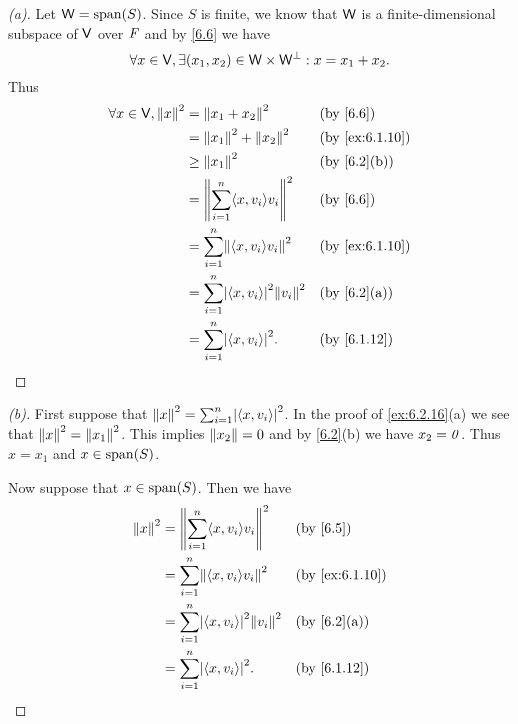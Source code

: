 \begin{proof}[(a)]
	Let \(\W = \spn{S}\).
	Since \(S\) is finite, we know that \(\mathsf{W}\) is a finite-dimensional subspace of \(\mathsf{V}\) over \(\mathit{F}\) and by \cref{6.6} we have
	\[
		\forall x \in \mathsf{V}, \exists (x_1, x_2) \in \mathsf{W} \times \mathsf{W}^{\perp} : x = x_1 + x_2.
	\]
	Thus
	\begin{align*}
		\forall x \in \V, \norm{x}^2 & = \norm{x_1 + x_2}^2                               &  & \by{6.6}       \\
		                             & = \norm{x_1}^2 + \norm{x_2}^2                      &  & \by{ex:6.1.10} \\
		                             & \geq \norm{x_1}^2                                  &  & \by{6.2}[b]    \\
		                             & = \norm{\sum_{i = 1}^n \inn{x, v_i} v_i}^2         &  & \by{6.6}       \\
		                             & = \sum_{i = 1}^n \norm{\inn{x, v_i} v_i}^2         &  & \by{ex:6.1.10} \\
		                             & = \sum_{i = 1}^n \abs{\inn{x, v_i}}^2 \norm{v_i}^2 &  & \by{6.2}[a]    \\
		                             & = \sum_{i = 1}^n \abs{\inn{x, v_i}}^2.             &  & \by{6.1.12}
	\end{align*}
\end{proof}

\begin{proof}[(b)]
	First suppose that \(\norm{x}^2 = \sum_{i = 1}^n \abs{\inn{x, v_i}}^2\).
	In the proof of \cref{ex:6.2.16}(a) we see that \(\left\lVert x\right\rVert^2 = \left\lVert x_1\right\rVert^2\).
	This implies \(\left\lVert x_2\right\rVert = 0\) and by \cref{6.2}(b) we have \(x_2 = \mathit{0}\).
	Thus \(x = x_1\) and \(x \in \spn{S}\).

	Now suppose that \(x \in \spn{S}\).
	Then we have
	\begin{align*}
		\norm{x}^2 & = \norm{\sum_{i = 1}^n \inn{x, v_i} v_i}^2         &  & \by{6.5}       \\
		           & = \sum_{i = 1}^n \norm{\inn{x, v_i} v_i}^2         &  & \by{ex:6.1.10} \\
		           & = \sum_{i = 1}^n \abs{\inn{x, v_i}}^2 \norm{v_i}^2 &  & \by{6.2}[a]    \\
		           & = \sum_{i = 1}^n \abs{\inn{x, v_i}}^2.             &  & \by{6.1.12}
	\end{align*}
\end{proof}

